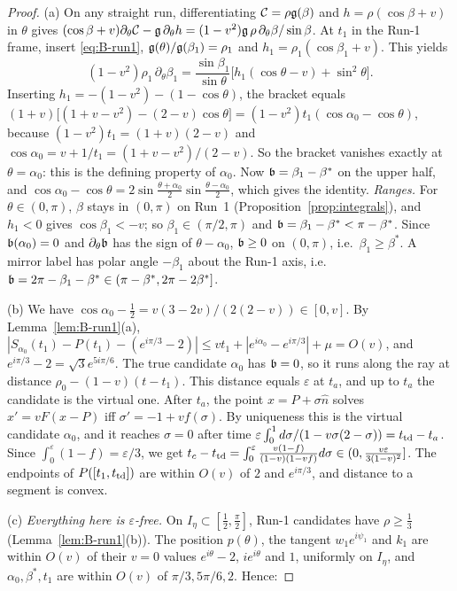 \begin{proof}
(a) On any straight run, differentiating $\mathcal C=\rho\mathfrak{g}(\beta)$ and $h=\rho(\cos\beta+v)$ in $\theta$ gives
$(\cos\beta+v)\partial_\theta\mathcal C-\mathfrak{g}\,\partial_\theta h=(1-v^2)\mathfrak{g}\,\rho\,\partial_\theta\beta/\sin\beta$. At $t_1$ in the Run-1 frame, insert
\eqref{eq:B-run1}, $\mathfrak{g}(\theta)/\mathfrak{g}(\beta_1)=\rho_1$ and $h_1=\rho_1(\cos\beta_1+v)$. This yields
\[
(1-v^2)\rho_1\,\partial_\theta\beta_1=\frac{\sin\beta_1}{\sin\theta}\bigl[h_1(\cos\theta-v)+\sin^2\theta\bigr].
\]
Inserting $h_1=-(1-v^2)-(1-\cos\theta)$, the bracket equals $(1+v)\bigl[(1+v-v^2)-(2-v)\cos\theta\bigr]
=(1-v^2)t_1(\cos\alpha_0-\cos\theta)$, because $(1-v^2)t_1=(1+v)(2-v)$ and $\cos\alpha_0=v+1/t_1=(1+v-v^2)/(2-v)$. So the
bracket vanishes exactly at $\theta=\alpha_0$: this is the defining property of $\alpha_0$. Now $\mathfrak{b}=\beta_1-\beta^*$ on the
upper half, and $\cos\alpha_0-\cos\theta=2\sin\frac{\theta+\alpha_0}2\sin\frac{\theta-\alpha_0}2$, which gives the identity.
\emph{Ranges.} For $\theta\in(0,\pi)$, $\beta$ stays in $(0,\pi)$ on Run~1 (Proposition~\ref{prop:integrals}), and $h_1<0$ gives
$\cos\beta_1<-v$; so $\beta_1\in(\pi/2,\pi)$ and $\mathfrak{b}=\beta_1-\beta^*<\pi-\beta^*$. Since $\mathfrak{b}(\alpha_0)=0$ and
$\partial_\theta\mathfrak{b}$ has the sign of $\theta-\alpha_0$, $\mathfrak{b}\ge0$ on $(0,\pi)$, i.e.\ $\beta_1\ge\beta^*$. A mirror label has
polar angle $-\beta_1$ about the Run-1 axis, i.e.\ $\mathfrak{b}=2\pi-\beta_1-\beta^*\in(\pi-\beta^*,2\pi-2\beta^*]$.

(b) We have $\cos\alpha_0-\frac12=v(3-2v)/(2(2-v))\in[0,v]$. By Lemma~\ref{lem:B-run1}(a),
$|S_{\alpha_0}(t_1)-P(t_1)-(e^{i\pi/3}-2)|\le vt_1+|e^{i\alpha_0}-e^{i\pi/3}|+\mu=O(v)$, and $e^{i\pi/3}-2=\sqrt3e^{5i\pi/6}$. The true
candidate $\alpha_0$ has $\mathfrak{b}=0$, so it runs along the ray at distance $\rho_0-(1-v)(t-t_1)$. This distance equals $\varepsilon$ at
$t_a$, and up to $t_a$ the candidate is the virtual one. After $t_a$, the point $x=P+\sigma\hat n$ solves $x'=vF(x-P)$ iff
$\sigma'=-1+vf(\sigma)$. By uniqueness this is the virtual candidate $\alpha_0$, and it reaches $\sigma=0$ after time
$\varepsilon\int_0^1d\sigma/(1-v\sigma(2-\sigma))=t_{\mathrm{td}}-t_a$. Since $\int_0^\varepsilon(1-f)=\varepsilon/3$, we get
$t_c-t_{\mathrm{td}}=\int_0^\varepsilon\frac{v(1-f)}{(1-v)(1-vf)}d\sigma\in(0,\frac{v\varepsilon}{3(1-v)^2}]$. The endpoints of $P([t_1,t_{\mathrm{td}}])$ are
within $O(v)$ of $2$ and $e^{i\pi/3}$, and distance to a segment is convex.

(c) \emph{Everything here is $\varepsilon$-free.} On $I_\eta\subset[\frac12,\frac\pi2]$, Run-1 candidates have $\rho\ge\frac13$
(Lemma~\ref{lem:B-run1}(b)). The position $p(\theta)$, the tangent $w_1e^{i\psi_1}$ and $k_1$ are within $O(v)$ of their $v=0$ values
$e^{i\theta}-2$, $ie^{i\theta}$ and $1$, uniformly on $I_\eta$, and $\alpha_0,\beta^*,t_1$ are within $O(v)$ of $\pi/3,5\pi/6,2$. Hence:


\end{proof}
